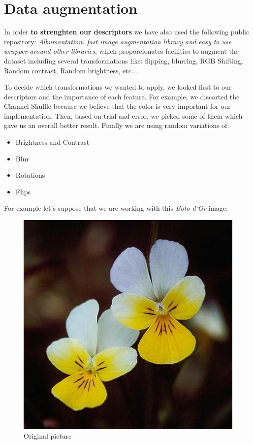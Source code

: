 \documentclass[11]{article}
\begin{document}
\section{Data augmentation}
In order \textbf{to strenghten our descriptors} we have also used the following public repository:  \textit{Albumentation: fast image augmentation library and easy to use wrapper around other libraries}\cite{Albumentations}, which proporcionates facilities to augment the dataset including several transformations like: flipping, blurring, RGB Shifting, Random contrast, Random brightness, etc...
\medskip

To decide which transformations we wanted to apply, we looked first to our descriptors and the importance of each feature. For example, we discarted the Channel Shuffle because we believe that the color is very important for our implementation. Then, based on trial and error, we picked some of them which gave us an overall better result. Finally we are using random variations of:
\begin{itemize}
    \item Brightness and Contrast
    \item Blur
    \item Rotations
    \item Flips
\end{itemize}
For example let's suppose that we are working with this \textit{Boto d'Or} image:
\begin{figure}[H]
    \centering
    \includegraphics[scale=0.25]{images/original.jpg}
    \caption{Original picture}
    \label{original}
\end{figure}
\end{document}
